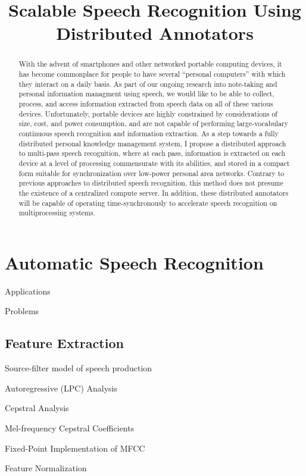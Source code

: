 \documentclass{article}
\title{Scalable Speech Recognition Using Distributed Annotators}
\begin{document}
\begin{abstract}

  With the advent of smartphones and other networked portable
  computing devices, it has become commonplace for people to have
  several ``personal computers'' with which they interact on a daily
  basis.  As part of our ongoing research into note-taking and
  personal information managment using speech, we would like to be
  able to collect, process, and access information extracted from
  speech data on all of these various devices.  Unfortunately,
  portable devices are highly constrained by considerations of size,
  cost, and power consumption, and are not capable of performing
  large-vocabulary continuous speech recognition and information
  extraction.  As a step towards a fully distributed personal
  knowledge management system, I propose a distributed approach to
  multi-pass speech recognition, where at each pass, information is
  extracted on each device at a level of processing commensurate with
  its abilities, and stored in a compact form suitable for
  synchronization over low-power personal area networks.  Contrary to
  previous approaches to distributed speech recognition, this method
  does not presume the existence of a centralized compute server.  In
  addition, these distributed annotators will be capable of operating
  time-synchronously to accelerate speech recognition on
  multiprocessing systems.
  
\end{abstract}

\section{Automatic Speech Recognition}
\label{sec:asr}

Applications

Problems

\subsection{Feature Extraction}
\label{sec:fe}

Source-filter model of speech production

Autoregressive (LPC) Analysis

Cepstral Analysis

Mel-frequency Cepstral Coefficients

Fixed-Point Implementation of MFCC

Feature Normalization
\end{document}

